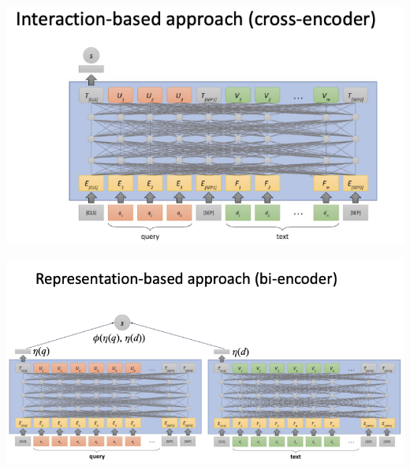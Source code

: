\begin{minipage}{0.5\textwidth}
\includegraphics[scale=0.5]{figures/repr3.png}
\end{minipage}
\begin{minipage}{0.5\textwidth}
\includegraphics[scale=0.5]{figures/repr4.png}
\end{minipage}

